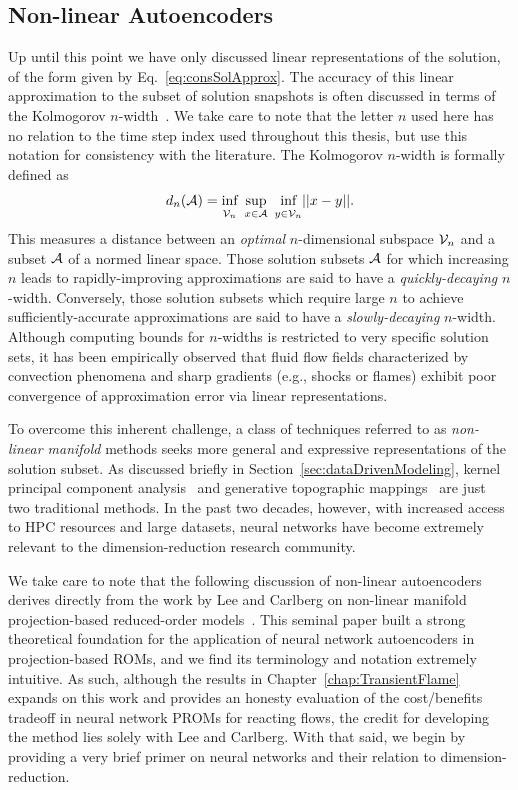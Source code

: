 \subsection{Non-linear Autoencoders}\label{subsec:nonlinManifold}

Up until this point we have only discussed linear representations of the solution, of the form given by Eq.~\ref{eq:consSolApprox}. The accuracy of this linear approximation to the subset of solution snapshots is often discussed in terms of the Kolmogorov $n$-width~\cite{Pinkus1985}. We take care to note that the letter $n$ used here has no relation to the time step index used throughout this thesis, but use this notation for consistency with the literature. The Kolmogorov $n$-width is formally defined as
%
\begin{equation}\label{eq:nwidth}
    d_n(\mathcal{A}) = \underset{\mathcal{V}_n}{\vphantom{sup}\text{inf}} \enspace \underset{x \in \mathcal{A}}{\text{sup}} \enspace \underset{y \in \mathcal{V}_n}{\vphantom{sup}\text{inf}} || x - y ||.
\end{equation}
%
This measures a distance between an \textit{optimal} $n$-dimensional subspace $\mathcal{V}_n$ and a subset $\mathcal{A}$ of a normed linear space. Those solution subsets $\mathcal{A}$ for which increasing $n$ leads to rapidly-improving approximations are said to have a \textit{quickly-decaying} $n$-width. Conversely, those solution subsets which require large $n$ to achieve sufficiently-accurate approximations are said to have a \textit{slowly-decaying} $n$-width. Although computing bounds for $n$-widths is restricted to very specific solution sets, it has been empirically observed that fluid flow fields characterized by convection phenomena and sharp gradients (e.g., shocks or flames) exhibit poor convergence of approximation error via linear representations.

To overcome this inherent challenge, a class of techniques referred to as \textit{non-linear manifold} methods seeks more general and expressive representations of the solution subset. As discussed briefly in Section~\ref{sec:dataDrivenModeling}, kernel principal component analysis~\cite{kernelPCA} and generative topographic mappings~\cite{Bishop1997} are just two traditional methods. In the past two decades, however, with increased access to HPC resources and large datasets, neural networks have become extremely relevant to the dimension-reduction research community.

We take care to note that the following discussion of non-linear autoencoders derives directly from the work by Lee and Carlberg on non-linear manifold projection-based reduced-order models~\cite{Lee2020}. This seminal paper built a strong theoretical foundation for the application of neural network autoencoders in projection-based ROMs, and we find its terminology and notation extremely intuitive. As such, although the results in Chapter~\ref{chap:TransientFlame} expands on this work and provides an honesty evaluation of the cost/benefits tradeoff in neural network PROMs for reacting flows, the credit for developing the method lies solely with Lee and Carlberg. With that said, we begin by providing a very brief primer on neural networks and their relation to dimension-reduction.


